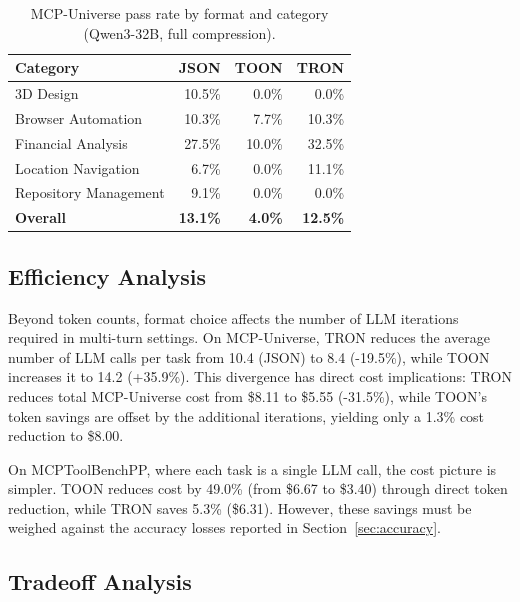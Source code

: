 \documentclass[11pt]{article}
\begin{document}
\begin{table}[t]
    \centering
    \footnotesize
    \caption{MCP-Universe pass rate by format and category (Qwen3-32B, full compression).}
    \label{tab:universe_accuracy}
    \begin{tabular}{@{}lrrr@{}}
        \toprule
        \textbf{Category} & \textbf{JSON} & \textbf{TOON} & \textbf{TRON} \\
        \midrule
        3D Design & 10.5\% & 0.0\% & 0.0\% \\
        Browser Automation & 10.3\% & 7.7\% & 10.3\% \\
        Financial Analysis & 27.5\% & 10.0\% & 32.5\% \\
        Location Navigation & 6.7\% & 0.0\% & 11.1\% \\
        Repository Management & 9.1\% & 0.0\% & 0.0\% \\
        \midrule
        \textbf{Overall} & \textbf{13.1\%} & \textbf{4.0\%} & \textbf{12.5\%} \\
        \bottomrule
    \end{tabular}
\end{table}

\subsection{Efficiency Analysis}
\label{sec:efficiency}

Beyond token counts, format choice affects the number of LLM iterations required in multi-turn settings. On MCP-Universe, TRON reduces the average number of LLM calls per task from 10.4 (JSON) to 8.4 (-19.5\%), while TOON increases it to 14.2 (+35.9\%). This divergence has direct cost implications: TRON reduces total MCP-Universe cost from \$8.11 to \$5.55 (-31.5\%), while TOON's token savings are offset by the additional iterations, yielding only a 1.3\% cost reduction to \$8.00.

On MCPToolBenchPP, where each task is a single LLM call, the cost picture is simpler. TOON reduces cost by 49.0\% (from \$6.67 to \$3.40) through direct token reduction, while TRON saves 5.3\% (\$6.31). However, these savings must be weighed against the accuracy losses reported in Section~\ref{sec:accuracy}.

\subsection{Tradeoff Analysis}
\label{sec:tradeoff}
\end{document}
